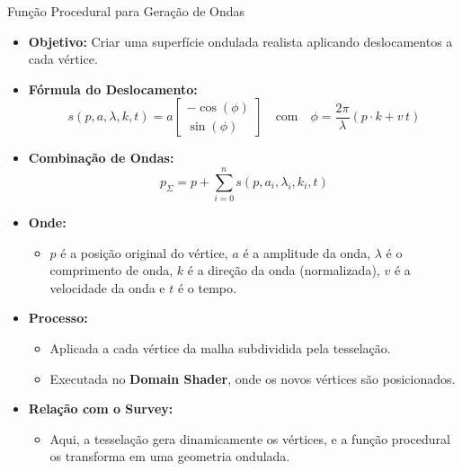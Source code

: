 \documentclass[aspectratio=169,xcolor=table]{beamer}
\begin{document}
  \begin{frame}{Função Procedural para Geração de Ondas}
    \footnotesize
        \begin{itemize}
            \item \textbf{Objetivo:} Criar uma superfície ondulada realista aplicando deslocamentos a cada vértice.
            \item \textbf{Fórmula do Deslocamento:}
                \[
                s(p, a, \lambda, k, t) = a \begin{bmatrix} -\cos(\phi) \\ \sin(\phi) \end{bmatrix} \quad \text{com} \quad \phi = \frac{2\pi}{\lambda}(p\cdot k + v\,t)
                \]
            \item \textbf{Combinação de Ondas:}
                \[
                p_\Sigma = p + \sum_{i=0}^{n} s(p, a_i, \lambda_i, k_i, t)
                \]
            \item \textbf{Onde:}
                \begin{itemize}
                    \item \textbf{\(p\)} é a posição original do vértice, \textbf{\(a\)} é a amplitude da onda, \textbf{\(\lambda\)} é o comprimento de onda, \textbf{\(k\)} é a direção da onda (normalizada), \textbf{\(v\)} é a velocidade da onda e \textbf{\(t\)} é o tempo.
                \end{itemize}
            \item \textbf{Processo:} 
                \begin{itemize}
                    \item Aplicada a cada vértice da malha subdividida pela tesselação.
                    \item Executada no \textbf{Domain Shader}, onde os novos vértices são posicionados.
                \end{itemize}
            \item \textbf{Relação com o Survey:} 
                \begin{itemize}
                    \item Aqui, a tesselação gera dinamicamente os vértices, e a função procedural os transforma em uma geometria ondulada.
                \end{itemize}
        \end{itemize}
    \end{frame}
\end{document}

